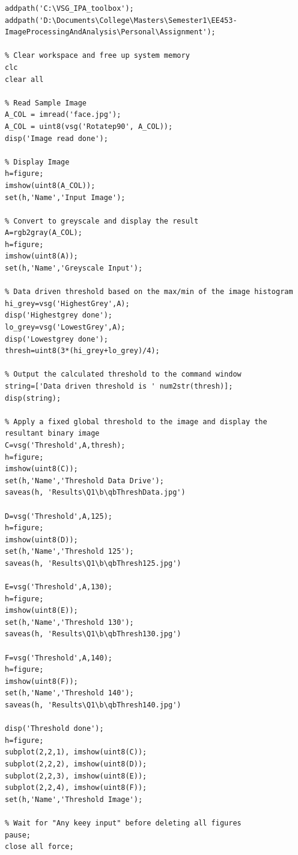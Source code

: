 \documentclass[a4paper]{article}
\begin{document}
\begin{lstlisting}[caption={Part 1 b}]
% Setup Paths to VSG Toolbox and Local Data
addpath('C:\VSG_IPA_toolbox');
addpath('D:\Documents\College\Masters\Semester1\EE453-ImageProcessingAndAnalysis\Personal\Assignment');

% Clear workspace and free up system memory
clc
clear all

% Read Sample Image
A_COL = imread('face.jpg');
A_COL = uint8(vsg('Rotatep90', A_COL));
disp('Image read done');

% Display Image
h=figure;
imshow(uint8(A_COL));
set(h,'Name','Input Image');

% Convert to greyscale and display the result
A=rgb2gray(A_COL);
h=figure;
imshow(uint8(A));
set(h,'Name','Greyscale Input');

% Data driven threshold based on the max/min of the image histogram
hi_grey=vsg('HighestGrey',A);
disp('Highestgrey done');
lo_grey=vsg('LowestGrey',A);
disp('Lowestgrey done');
thresh=uint8(3*(hi_grey+lo_grey)/4);

% Output the calculated threshold to the command window
string=['Data driven threshold is ' num2str(thresh)];
disp(string);

% Apply a fixed global threshold to the image and display the resultant binary image
C=vsg('Threshold',A,thresh);
h=figure;
imshow(uint8(C));
set(h,'Name','Threshold Data Drive');
saveas(h, 'Results\Q1\b\qbThreshData.jpg')

D=vsg('Threshold',A,125);
h=figure;
imshow(uint8(D));
set(h,'Name','Threshold 125');
saveas(h, 'Results\Q1\b\qbThresh125.jpg')

E=vsg('Threshold',A,130);
h=figure;
imshow(uint8(E));
set(h,'Name','Threshold 130');
saveas(h, 'Results\Q1\b\qbThresh130.jpg')

F=vsg('Threshold',A,140);
h=figure;
imshow(uint8(F));
set(h,'Name','Threshold 140');
saveas(h, 'Results\Q1\b\qbThresh140.jpg')

disp('Threshold done');
h=figure;
subplot(2,2,1), imshow(uint8(C));
subplot(2,2,2), imshow(uint8(D));
subplot(2,2,3), imshow(uint8(E));
subplot(2,2,4), imshow(uint8(F));
set(h,'Name','Threshold Image');

% Wait for "Any keey input" before deleting all figures
pause;
close all force;
\end{lstlisting}
\end{document}
